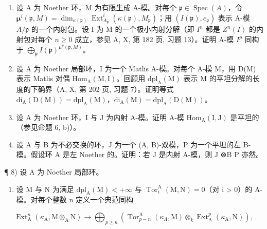 \begin{enumerate}
\def\labelenumi{\arabic{enumi})}
\setcounter{enumi}{3}
\item
  设 A 为 Noether 环，M 为有限生成 A-模。对每个 \(\mathfrak{p} \in \operatorname{Spec}(A)\)，令 \(\boldsymbol{\mu}^{i}(\mathfrak{p}, M) = \dim_{\kappa(\mathfrak{p})} \operatorname{Ext}_{A_{\mathfrak{p}}}^{i}(\kappa(\mathfrak{p}), M_{\mathfrak{p}})\)；用 \((I(\mathfrak{p}), e_{\mathfrak{p}})\) 表示 A-模 \(A/\mathfrak{p}\) 的一个内射包。设 I 为 M 的一个极小内射分解（即 \(I^{n}\) 都是 \(Z^{n}(I)\) 的内射包对每个 \(n \geqslant 0\) 成立，参见 A, X, 第 182 页, 习题 13）。证明 A-模 \(I^{p}\) 同构于 \(\bigoplus_{\mathfrak{p}} I(\mathfrak{p})^{\mu^{p}(\mathfrak{p}, M)}\)。
\item
  设 A 为 Noether 局部环，I 为一个 Matlis A-模。对每个 A-模 M，用 D(M) 表示 Matlis 对偶 \(\mathrm{Hom}_{\mathrm{A}}(\mathrm{M},\mathrm{I})\)。回顾用 \(\mathrm{dpl}_{\mathrm{A}}(\mathrm{M})\) 表示 M 的平坦分解的长度的下确界（A, X, 第 202 页, 习题 7）。证明等式 \(\mathrm{di}_{\mathrm{A}}(\mathrm{D}(\mathrm{M})) = \mathrm{dpl}_{\mathrm{A}}(\mathrm{M})\)，\(\mathrm{di}_{\mathrm{A}}(\mathrm{M}) = \mathrm{dpl}_{\mathrm{A}}(\mathrm{D}(\mathrm{M}))\)。
\item
  设 A 为 Noether 环，I 与 J 为内射 A-模。证明 A-模 \(\mathrm{Hom}_{\mathrm{A}}(\mathrm{I},\mathrm{J})\) 是平坦的（参见命题 6, b)）。
\item
  设 A 与 B 为不必交换的环，J 为一个 (A, B)-双模，P 为一个平坦的左 B-模。假设环 A 是左 Noether 的。证明：若 J 是内射 A-模，则 J ⊗B P 亦然。
\end{enumerate}

¶ 8) 设 A 为 Noether 局部环。

\begin{enumerate}
\def\labelenumi{\alph{enumi})}
\tightlist
\item
  设 M 与 N 为满足 \(\mathrm{dpl}_{\mathrm{A}}(\mathrm{M}) < +\infty\) 与 \(\operatorname{Tor}_{i}^{\mathrm{A}}(\mathrm{M}, \mathrm{N}) = 0\)（对 i \textgreater{} 0）的 A-模。对每个整数 n 定义一个典范同构
\end{enumerate}

\[
\operatorname{Ext} _ {\mathrm{A}} ^ {n} \left(\kappa_ {\mathrm{A}}, \mathrm{M} \otimes_ {\mathrm{A}} \mathrm{N}\right) \longrightarrow \bigoplus_ {p \geqslant n} \left(\operatorname{Tor} _ {p - n} ^ {\mathrm{A}} \left(\kappa_ {\Lambda}, \mathrm{M}\right) \otimes_ {k} \operatorname{Ext} _ {\mathrm{A}} ^ {p} \left(\kappa_ {\mathrm{A}}, \mathrm{N}\right)\right),
\]

